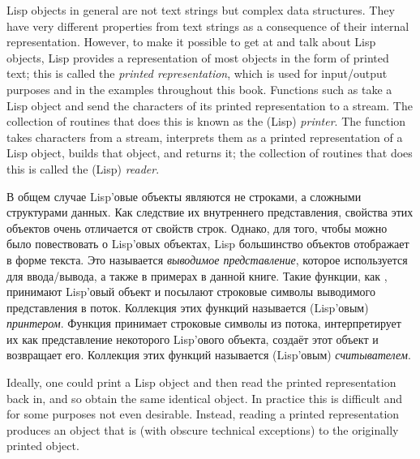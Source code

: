 
Lisp objects in general are not text strings but complex data structures.
They have very different properties from text strings as a consequence of
their internal representation.  However, to make it possible to get at
and talk about Lisp objects, Lisp provides a representation of
most objects in the form of printed text; this is called the \emph{printed
representation}, which is used for input/output purposes and in the
examples throughout this book.  Functions such as  take a
Lisp object and send the characters of its printed representation to a
stream.  The collection of routines that does this is known as the
(Lisp) \emph{printer}.  The  function takes characters from a
stream, interprets them as a printed representation of a Lisp object,
builds that object, and returns it; the collection of routines
that does this is called the (Lisp) \emph{reader}.

В общем случае Lisp'овые объекты являются не строками, а сложными структурами
данных.  Как следствие их внутреннего представления, свойства этих объектов
очень отличается от свойств строк. Однако, для того, чтобы можно было
повествовать о Lisp'овых объектах, Lisp большинство объектов отображает в форме
текста. Это называется \emph{выводимое представление}, которое используется для
ввода/вывода, а также в примерах в данной книге. Такие функции, как ,
принимают Lisp'овый объект и посылают строковые символы выводимого представления
в поток. Коллекция этих функций называется (Lisp'овым) \emph{принтером}. Функция
 принимает строковые символы из потока, интерпретирует их как
представление некоторого Lisp'ового объекта, создаёт этот объект и возвращает
его. Коллекция этих функций называется (Lisp'овым) \emph{считывателем}.

Ideally, one could print a Lisp object and
then read the printed representation back in, and so obtain the same identical
object.  In practice this is difficult and for some purposes not even desirable.
Instead, reading a printed representation produces an object that is (with
obscure technical exceptions)  to the originally printed object.

